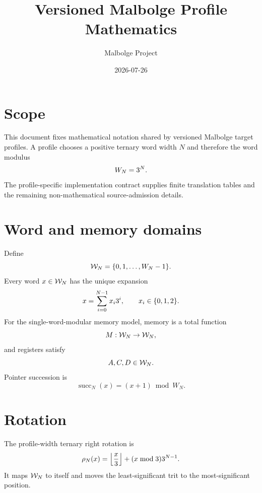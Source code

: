 \documentclass{article}
\title{Versioned Malbolge Profile Mathematics}
\author{Malbolge Project}
\date{2026{-}07{-}26}
\begin{document}
\maketitle

\section{Scope}

This document fixes mathematical notation shared by versioned Malbolge target
profiles. A profile chooses a positive ternary word width $N$ and therefore the
word modulus
\begin{equation}
  W_N = 3^{N}.
  \label{eq:profile-word-modulus}
\end{equation}
The profile-specific implementation contract supplies finite translation tables
and the remaining non-mathematical source-admission details.

\section{Word and memory domains}

Define
\begin{equation}
  \mathcal{W}_{N} = \{0,1,\ldots,W_N-1\}.
  \label{eq:profile-word-domain}
\end{equation}
Every word $x\in\mathcal{W}_{N}$ has the unique expansion
\[
  x = \sum_{i=0}^{N-1} x_i3^i,
  \qquad x_i\in\{0,1,2\}.
\]
For the single-word-modular memory model, memory is a total function
\begin{equation}
  M : \mathcal{W}_{N}\to\mathcal{W}_{N},
  \label{eq:profile-memory-domain}
\end{equation}
and registers satisfy
\[
  A,C,D\in\mathcal{W}_{N}.
\]
Pointer succession is
\begin{equation}
  \operatorname{succ}_N(x)=(x+1)\bmod W_N.
  \label{eq:profile-successor}
\end{equation}

\section{Rotation}

The profile-width ternary right rotation is
\begin{equation}
  \rho_{N}\!\left(x\right)
    = \left\lfloor\frac{x}{3}\right\rfloor
      + (x\bmod 3)3^{N-1}.
  \label{eq:profile-rotate}
\end{equation}
It maps $\mathcal{W}_{N}$ to itself and moves the least-significant trit to the
most-significant position.
\end{document}
